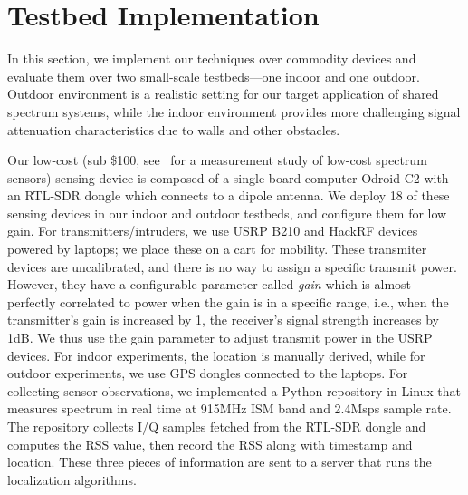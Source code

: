 \section{Testbed Implementation}
\label{sec:testbed}

In this section, we implement our techniques over commodity devices
and evaluate them over two small-scale testbeds---one indoor and one
outdoor.  Outdoor environment is a realistic setting for our target
application of shared spectrum systems, while the indoor environment
provides more challenging signal attenuation characteristics due to
walls and other obstacles.

  Our low-cost (sub \$100, see~\cite{pam19-lowcostsensing} for a measurement study of low-cost spectrum sensors)
sensing device  is composed of a single-board computer
Odroid-C2 with an RTL-SDR dongle which
connects to a dipole antenna. We deploy 18 of these sensing devices
in our indoor and outdoor testbeds, and configure them for low gain.
For transmitters/intruders, we use USRP B210 and HackRF devices
  powered by laptops; we place these on a cart for mobility. These
  transmiter devices are uncalibrated, and there is no way to assign a
  specific transmit power. However, they have a configurable parameter
  called {\em gain} which is almost perfectly correlated to power when
  the gain is in a specific range, i.e., when the transmitter's gain
  is increased by 1, the receiver's signal strength increases by
  1dB. We thus use the gain parameter to adjust transmit power in the
  USRP devices. For indoor experiments, the location is manually
  derived, while for outdoor experiments, we use GPS
  dongles connected to the laptops. For collecting sensor
  observations, we implemented a Python repository in Linux that
  measures spectrum in real time at 915MHz ISM band and 2.4Msps
  sample rate.  The repository collects I/Q samples fetched from the
  RTL-SDR dongle and computes the RSS value, then record the RSS along
  with timestamp and location.  These three pieces of information are
  sent to a server that runs the localization algorithms. 

